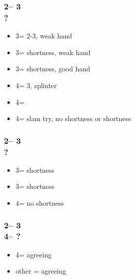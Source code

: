 \documentclass[12pt, a4paper]{article}
\begin{document}
\subsubsection*{2\spades -- 3\diams\\
                ?}
\begin{itemize}
    \item 3\hearts = 2-3\hearts, weak hand
    \item 3\spades = \hearts shortness, weak hand
    \item 3\nt = \hearts shortness, good hand
    \item 4\clubs = 3\hearts, splinter
    \item 4\diams = \hearts
    \item 4\hearts = slam try, no shortness or \diams shortness
\end{itemize}

\subsubsection*{2\spades -- 3\hearts\\
                ?}
\begin{itemize}
    \item 3\spades = \clubs shortness
    \item 3\nt = \diams shortness
    \item 4\clubs = no \minor shortness
\end{itemize}

\subsubsection*{2\spades -- 3\hearts\\
                4\clubs -- ?}
\begin{itemize}
    \item 4\diams = agreeing \diams
    \item other = agreeing \clubs
\end{itemize}

\end{document}
